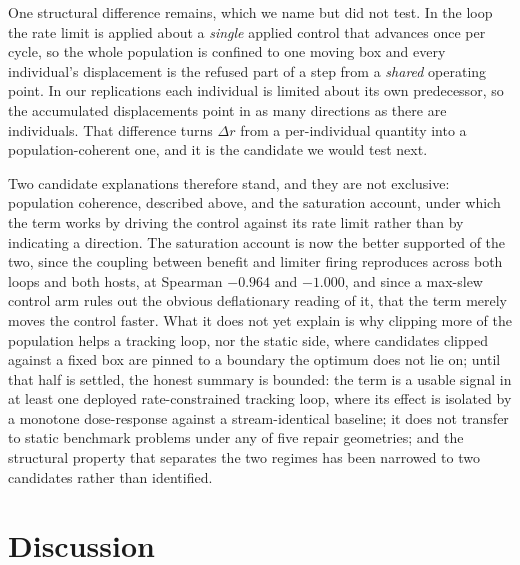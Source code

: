 \documentclass[11pt,a4paper]{article}
\begin{document}
One structural difference remains, which we name but did not test. In the loop the rate
limit is applied about a \emph{single} applied control that advances once per cycle, so the
whole population is confined to one moving box and every individual's displacement is the
refused part of a step from a \emph{shared} operating point. In our replications each
individual is limited about its own predecessor, so the accumulated displacements point in
as many directions as there are individuals. That difference turns $\Delta r$ from a
per-individual quantity into a population-coherent one, and it is the candidate we would
test next.

Two candidate explanations therefore stand, and they are not exclusive: population
coherence, described above, and the saturation account, under which the term works by
driving the control against its rate limit rather than by indicating a direction. The
saturation account is now the better supported of the two, since the coupling between
benefit and limiter firing reproduces across both loops and both hosts, at Spearman
$-0.964$ and $-1.000$, and since a max-slew control arm rules out the obvious deflationary
reading of it, that the term merely moves the control faster. What it does not yet explain is
why clipping more of the population helps a tracking loop, nor the static side, where
candidates clipped against a fixed box are pinned to a boundary the optimum does not lie on;
until that half is settled, the honest summary is bounded: the term is a usable
signal in at least one deployed rate-constrained tracking loop, where its effect is
isolated by a monotone dose-response against a stream-identical baseline; it does not
transfer to static benchmark problems under any of five repair geometries; and the
structural property that separates the two regimes has been narrowed to two candidates
rather than identified.

\section{Discussion}
\end{document}
